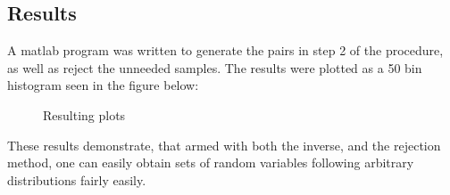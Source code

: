\subsection{Results}
A matlab program was written to generate the pairs in step 2 of the procedure, as well as reject the unneeded samples. The results were plotted as a 50 bin histogram seen in the figure below:
\\

\begin{figure}[h!]
    \begin{center}

    \caption{Resulting plots}
    \end{center}
\end{figure}




These results demonstrate, that armed with both the inverse, and the rejection method, one can easily obtain sets of random variables following arbitrary distributions fairly easily.

